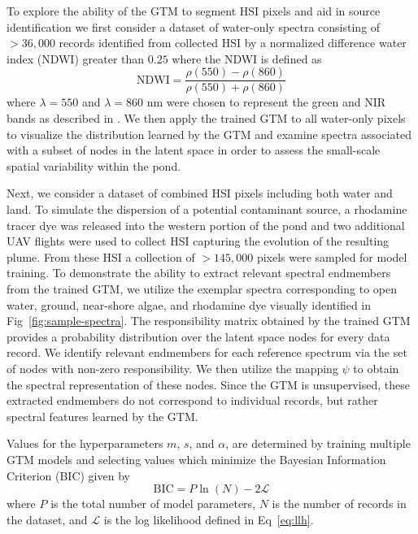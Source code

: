 \documentclass[remotesensing,article,submit,pdftex,moreauthors]{Definitions/mdpi}
\begin{document}
To explore the ability of the GTM to segment HSI pixels and aid in source identification we first consider a dataset of water-only spectra consisting of $>36,000$ records identified from collected HSI by a normalized difference water index (NDWI) greater than $0.25$ where the NDWI is defined as 
\begin{equation}
    \text{NDWI} = \dfrac{\rho(550) - \rho(860)}{\rho(550) + \rho(860)}
\end{equation}
where $\lambda=550$ and $\lambda=860$ nm were chosen to represent the green and NIR bands as described in \cite{ndwi}. We then apply the trained GTM to all water-only pixels to visualize the distribution learned by the GTM and examine spectra associated with a subset of nodes in the latent space in order to assess the small-scale spatial variability within the pond.

Next, we consider a dataset of combined HSI pixels including both water and land. To simulate the dispersion of a potential contaminant source, a rhodamine tracer dye was released into the western portion of the pond and two additional UAV flights were used to collect HSI capturing the evolution of the resulting plume. From these HSI a collection of $>145,000$ pixels were sampled for model training. To demonstrate the ability to extract relevant spectral endmembers from the trained GTM, we utilize the exemplar spectra corresponding to open water, ground, near-shore algae, and rhodamine dye visually identified in Fig~\ref{fig:sample-spectra}. The responsibility matrix obtained by the trained GTM provides a probability distribution over the latent space nodes for every data record. We identify relevant endmembers for each reference spectrum via the set of nodes with non-zero responsibility. We then utilize the mapping $\psi$ to obtain the spectral representation of these nodes. Since the GTM is unsupervised, these extracted endmembers do not correspond to individual records, but rather spectral features learned by the GTM. 

Values for the hyperparameters $m$, $s$, and $\alpha$, are determined by training multiple GTM models and selecting values which minimize the Bayesian Information Criterion (BIC) given by 
\begin{equation}
    \text{BIC} = P\ln(N) - 2\mathcal{L}
\end{equation}
where $P$ is the total number of model parameters, $N$ is the number of records in the dataset, and $\mathcal{L}$ is the log likelihood defined in Eq~\ref{eq:llh}.
\end{document}
